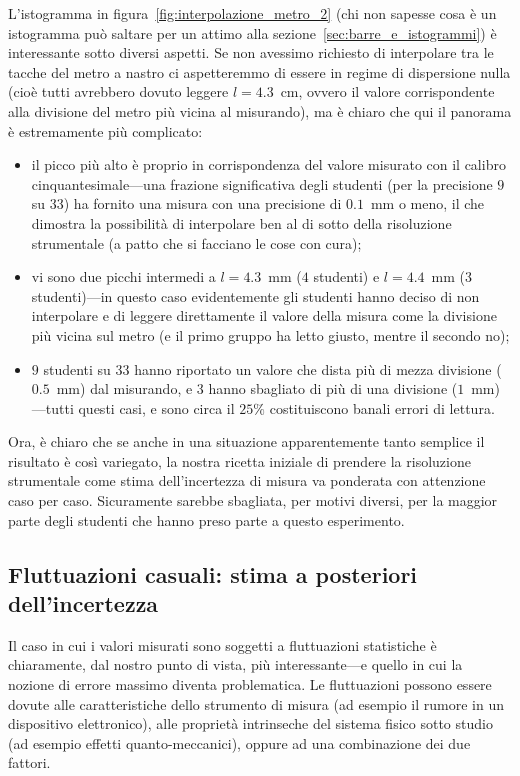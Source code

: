 L'istogramma in figura~\ref{fig:interpolazione_metro_2} (chi non sapesse
cosa è un istogramma può saltare per un attimo alla
sezione~\ref{sec:barre_e_istogrammi}) è interessante sotto
diversi aspetti. Se non avessimo richiesto di interpolare tra le tacche del
metro a nastro ci aspetteremmo di essere in regime di dispersione nulla (cioè
tutti avrebbero dovuto leggere $l = 4.3$~cm, ovvero il valore corrispondente
alla divisione del metro più vicina al misurando), ma è chiaro che qui
il panorama è estremamente più complicato:
\begin{itemize}
\item il picco più alto è proprio in corrispondenza del valore misurato
  con il calibro cinquantesimale---una frazione significativa degli studenti
  (per la precisione $9$ su $33$) ha fornito una misura con una precisione
  di $0.1$~mm o meno, il che dimostra la possibilità di interpolare ben al
  di sotto della risoluzione strumentale (a patto che si facciano le cose con
  cura);
\item vi sono due picchi intermedi a $l = 4.3$~mm ($4$ studenti) e $l = 4.4$~mm
  (3 studenti)---in questo caso evidentemente gli studenti hanno deciso di non
  interpolare e di leggere direttamente il valore della misura come la divisione
  più vicina sul metro (e il primo gruppo ha letto giusto, mentre il secondo
  no);
\item $9$ studenti su $33$ hanno riportato un valore che dista più di mezza
  divisione ($0.5$~mm) dal misurando, e $3$ hanno sbagliato di più di una
  divisione ($1$~mm)---tutti questi casi, e sono circa il $25\%$ costituiscono
  banali errori di lettura.
\end{itemize}

Ora, è chiaro che se anche in una situazione apparentemente tanto semplice
il risultato è così variegato, la nostra ricetta iniziale di prendere
la risoluzione strumentale come stima dell'incertezza di misura va ponderata
con attenzione caso per caso. Sicuramente sarebbe sbagliata, per motivi diversi,
per la maggior parte degli studenti che hanno preso parte a questo
esperimento.


\subsection{Fluttuazioni casuali: stima a posteriori dell'incertezza}

Il caso in cui i valori misurati sono soggetti a fluttuazioni statistiche
è chiaramente, dal nostro punto di vista, più interessante---e quello in
cui la nozione di errore massimo diventa problematica. Le fluttuazioni possono
essere dovute alle caratteristiche dello strumento di misura (ad esempio il
rumore in un dispositivo elettronico), alle proprietà intrinseche del sistema
fisico sotto studio (ad esempio effetti quanto-meccanici), oppure ad una
combinazione dei due fattori.

